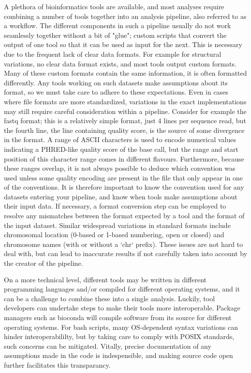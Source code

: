A plethora of bioinformatics tools are available, and most analyses require combining a number of tools together into an analysis pipeline, also referred to as a workflow. The different components in such a pipeline usually do not work seamlessly together without a bit of "glue"; custom scripts that convert the output of one tool so that it can be used as input for the next. This is necessary due to the frequent lack of clear data formats. For example for structural variations, no clear data format exists, and most tools output custom formats. Many of these custom formats contain the same information, it is often formatted differently. Any tools working on such datasets make assumptions about its format, so we must take care to adhere to these expectations. Even in cases where file formats are more standardized, variations in the exact implementations may still require careful consideration within a pipeline. Consider for example the fastq format; this is a relatively simple format, just 4 lines per sequence read, but the fourth line, the line containing quality score, is the source of some divergence in the format. A range of ASCII characters is used to encode numerical values indicating a PHRED-like quality score of the base call, but the range and start position of this character range comes in different flavours. Furthermore, because these ranges overlap, it is not always possible to deduce which convention was used unless some quality encoding are present in the file that only appear in one of the conventions. It is therefore important to know the convention used for any datasets entering your pipeline, and know when tools make assumptions about their input data. If necessary, a format conversion step can be employed to resolve any mismatches between the format expected by a tool and the format of the input dataset. Similar widespread variations in standard formats include chromosomal location (0-based or 1-based numbering, open or closed) and chromosome names (with or without a `chr` prefix). These issues are not hard to deal with, but can lead to inaccurate results if not carefully taken into account by the creator of the pipeline.

On a more technical level, different tools may be written in different programming languages and/or compiled for different operating systems, and it can be a challenge to combine these into a single analysis. Luckily, tool developers can undertake steps to make their tools more interoperable. Package managers such as bioconda will compile software from its source for different operating systems. For bash scripts, many OS-dependent syntax variations can hinder interoperabililty, but by taking care to comply with POSIX standards, such concerns can be mitigated. Vitally, precise documentation of any assumptions made in the code is indespensible, and making source code open further facilitates this transparancy.


